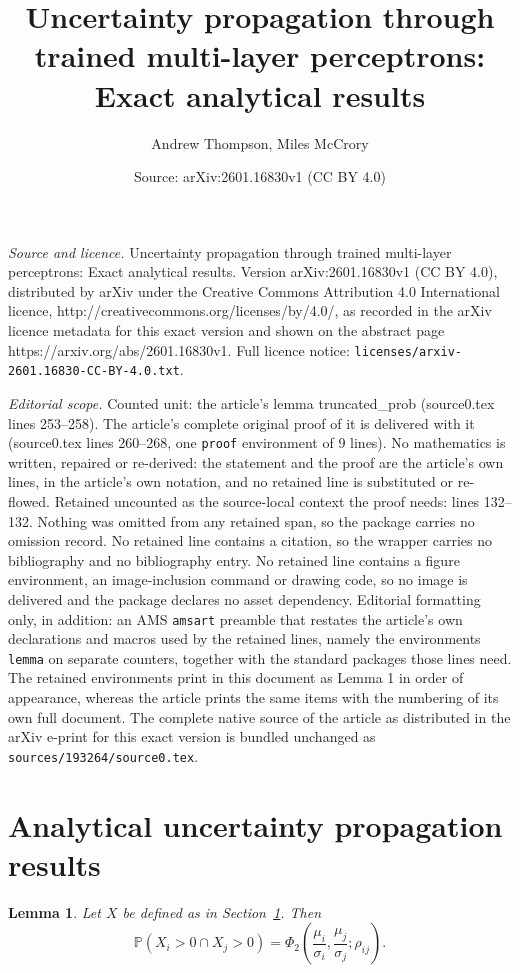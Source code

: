 \documentclass[10pt,a4paper]{amsart}
\title{Uncertainty propagation through trained multi-layer perceptrons: Exact analytical results}
\author{Andrew Thompson, Miles McCrory}
\date{Source: arXiv:2601.16830v1 (CC BY 4.0)}
\newtheorem{lemma}{Lemma}
\begin{document}
\maketitle

\noindent\emph{Source and licence.} Uncertainty propagation through trained multi-layer perceptrons: Exact analytical results. Version arXiv:2601.16830v1 (CC BY 4.0), distributed by arXiv under the Creative Commons Attribution 4.0 International licence, http://creativecommons.org/licenses/by/4.0/, as recorded in the arXiv licence metadata for this exact version and shown on the abstract page https://arxiv.org/abs/2601.16830v1. Full licence notice: \texttt{licenses/arxiv-2601.16830-CC-BY-4.0.txt}.\par\smallskip

\noindent\textit{Editorial scope.} Counted unit: the article's lemma truncated\_prob (source0.tex lines 253--258). The article's complete original proof of it is delivered with it (source0.tex lines 260--268, one \texttt{proof} environment of 9 lines). No mathematics is written, repaired or re-derived: the statement and the proof are the article's own lines, in the article's own notation, and no retained line is substituted or re-flowed.  Retained uncounted as the source-local context the proof needs: lines 132--132.  Nothing was omitted from any retained span, so the package carries no omission record.  No retained line contains a citation, so the wrapper carries no bibliography and no bibliography entry.  No retained line contains a figure environment, an image-inclusion command or drawing code, so no image is delivered and the package declares no asset dependency.  Editorial formatting only, in addition: an AMS \texttt{amsart} preamble that restates the article's own declarations and macros used by the retained lines, namely the environments \texttt{lemma} on separate counters, together with the standard packages those lines need.  The retained environments print in this document as Lemma 1 in order of appearance, whereas the article prints the same items with the numbering of its own full document.  The complete native source of the article as distributed in the arXiv e-print for this exact version is bundled unchanged as \texttt{sources/193264/source0.tex}.
\section{Analytical uncertainty propagation results}\label{analytical_results}

\begin{lemma}
Let $X$ be defined as in Section~\ref{analytical_results}. Then 
\begin{equation}\label{truncated_prob}\mathbb{P}(X_i > 0 \cap X_j > 0) = \Phi_2 \left( \frac{\mu_i}{\sigma_i}, \frac{\mu_j}{\sigma_j}; \rho_{ij} \right).
\end{equation}
\label{lem:conprob}
\end{lemma}
\end{document}
